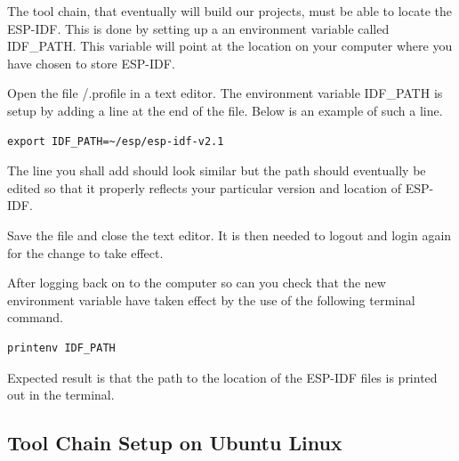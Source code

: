 \documentclass{tufte-book}
\begin{document}

The tool chain, that eventually will build our projects, must be able to locate the ESP-IDF. This is done by setting up a an environment variable called IDF\_PATH. This variable will point at the location on your computer where you have chosen to store ESP-IDF.

Open the file \texttildelow/.profile in a text editor. The environment variable IDF\_PATH is setup by adding a line at the end of the file. Below is an example of such a line.


\begin{lstlisting}
export IDF_PATH=~/esp/esp-idf-v2.1
\end{lstlisting}

The line you shall add should look similar but the path should  eventually be edited so that it properly reflects your particular version and location of ESP-IDF.

Save the file and close the text editor. It is then needed to logout and login again for the change to take effect.

After logging back on to the computer so can you check that the new environment variable have taken effect by the use of the following terminal command.

\begin{lstlisting}
printenv IDF_PATH
\end{lstlisting}

Expected result is that the path to the location of the ESP-IDF files is printed out in the terminal.\renewcommand{\textuparrow}{$\uparrow$}

\subsection{Tool Chain Setup on Ubuntu Linux}

\end{document}
